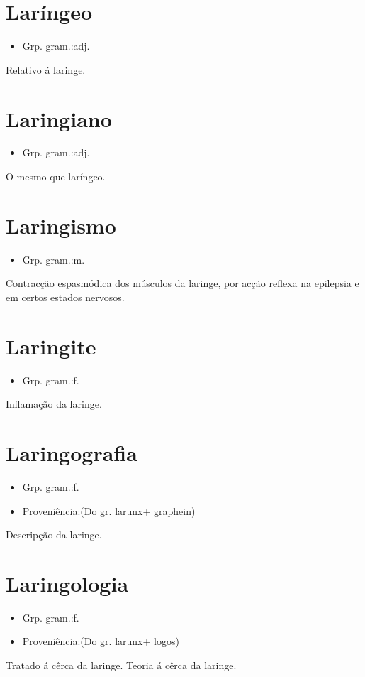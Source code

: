 \section{Laríngeo}
\begin{itemize}
\item {Grp. gram.:adj.}
\end{itemize}
Relativo á laringe.
\section{Laringiano}
\begin{itemize}
\item {Grp. gram.:adj.}
\end{itemize}
O mesmo que \textunderscore laríngeo\textunderscore .
\section{Laringismo}
\begin{itemize}
\item {Grp. gram.:m.}
\end{itemize}
Contracção espasmódica dos músculos da laringe, por acção reflexa na epilepsia e em certos estados nervosos.
\section{Laringite}
\begin{itemize}
\item {Grp. gram.:f.}
\end{itemize}
Inflamação da laringe.
\section{Laringografia}
\begin{itemize}
\item {Grp. gram.:f.}
\end{itemize}
\begin{itemize}
\item {Proveniência:(Do gr. \textunderscore larunx\textunderscore  + \textunderscore graphein\textunderscore )}
\end{itemize}
Descripção da laringe.
\section{Laringologia}
\begin{itemize}
\item {Grp. gram.:f.}
\end{itemize}
\begin{itemize}
\item {Proveniência:(Do gr. \textunderscore larunx\textunderscore  + \textunderscore logos\textunderscore )}
\end{itemize}
Tratado á cêrca da laringe.
Teoria á cêrca da laringe.
